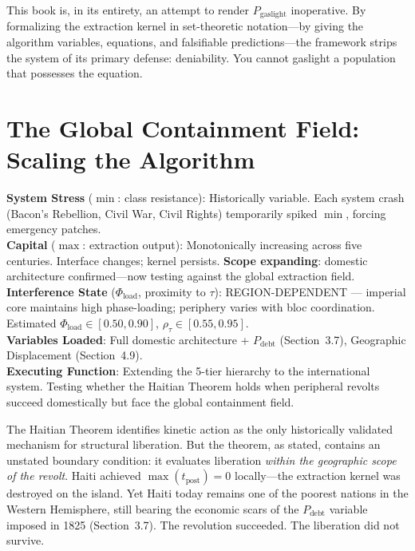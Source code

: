 \documentclass[12pt,openany]{book}
\begin{document}
This book is, in its entirety, an attempt to render $P_{\text{gaslight}}$ inoperative. By formalizing the extraction kernel in set-theoretic notation---by giving the algorithm variables, equations, and falsifiable predictions---the framework strips the system of its primary defense: deniability. You cannot gaslight a population that possesses the equation.

\chapter{The Global Containment Field: Scaling the Algorithm}

\begin{tcolorbox}[colback=black!5, colframe=black!70, fonttitle=\bfseries\ttfamily, title=RUNTIME LOG: SCALING DIAGNOSTIC TO IMPERIAL ARCHITECTURE]
\ttfamily\small
\textbf{System Stress} ($\min$: class resistance): Historically variable. Each system crash (Bacon's Rebellion{,} Civil War{,} Civil Rights) temporarily spiked $\min${,} forcing emergency patches.\\
\textbf{Capital} ($\max$: extraction output): Monotonically increasing across five centuries. Interface changes; kernel persists. \textbf{Scope expanding}: domestic architecture confirmed---now testing against the global extraction field.\\
\textbf{Interference State} ($\Phi_{\text{load}}$, proximity to $\tau$): REGION-DEPENDENT --- imperial core maintains high phase-loading; periphery varies with bloc coordination. Estimated $\Phi_{\text{load}} \in [0.50, 0.90]$, $\rho_{\tau} \in [0.55, 0.95]$.\\
\textbf{Variables Loaded}: Full domestic architecture + $P_{\text{debt}}$ (Section~3.7){,} Geographic Displacement (Section~4.9).\\
\textbf{Executing Function}: Extending the 5-tier hierarchy to the international system. Testing whether the Haitian Theorem holds when peripheral revolts succeed domestically but face the global containment field.
\end{tcolorbox}

\medskip

The Haitian Theorem identifies kinetic action as the only historically validated mechanism for structural liberation. But the theorem, as stated, contains an unstated boundary condition: it evaluates liberation \textit{within the geographic scope of the revolt}. Haiti achieved $\max(t_{\text{post}}) = 0$ locally---the extraction kernel was destroyed on the island. Yet Haiti today remains one of the poorest nations in the Western Hemisphere, still bearing the economic scars of the $P_{\text{debt}}$ variable imposed in 1825 (Section~3.7). The revolution succeeded. The liberation did not survive.
\end{document}
